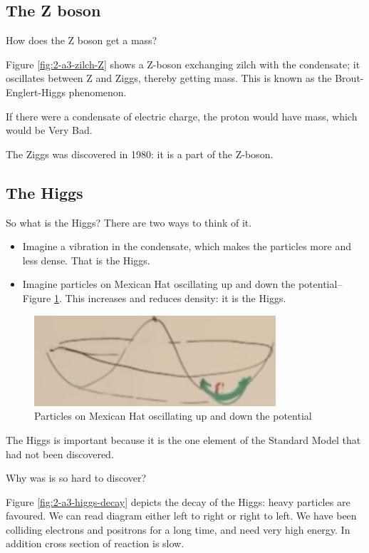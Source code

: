 \documentclass[]{article}
\begin{document}
\begin{appendices}
	\subsection{The Z boson}
	
	How does the Z boson get a mass?
	
	Figure \ref{fig:2-a3-zilch-Z} shows a Z-boson exchanging zilch with the condensate; it oscillates between Z and Ziggs, thereby getting mass. This is known as the Brout-Englert-Higgs phenomenon.
	
	If there were a condensate of electric charge, the proton would have mass, which would be Very Bad.
	
	The Ziggs was discovered in 1980: it is a part of the Z-boson.
	
	\subsection{The Higgs}
	
	So what is the Higgs? There are two ways to think of it.
	\begin{itemize}
		\item Imagine a vibration in the condensate, which makes the particles more and less dense. That is the Higgs.
		\item Imagine particles on Mexican Hat oscillating up and down the potential--Figure \ref{fig:2-a3-higgs1}. This increases and reduces density: it is the Higgs.
	\end{itemize}
	
	\begin{figure}[H]
		\caption{Particles on Mexican Hat oscillating up and down the potential}\label{fig:2-a3-higgs1}
		\includegraphics[width=0.8\textwidth]{2-a3-higgs1}
	\end{figure}

	The Higgs is important because it is the one element of the Standard Model that had not been discovered.
	
	Why was is so hard to discover?
	
	Figure \ref{fig:2-a3-higgs-decay} depicts the decay of the Higgs: heavy particles are favoured. We can read diagram either left to right or right to left. We have been colliding electrons and positrons for a long time, and need very high energy. In addition cross section of reaction is slow.
	

\end{appendices}
\end{document}
